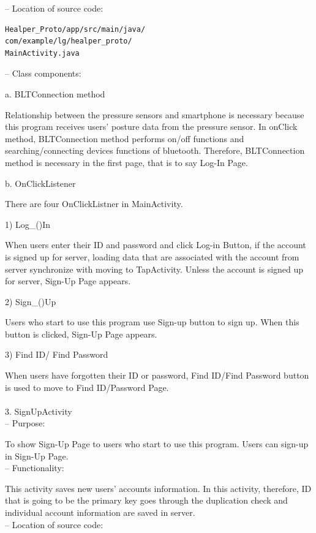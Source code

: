 \documentclass[conference]{IEEEtran}
\begin{document}
 -- Location of source code:
 
\begin{verbatim}
Healper_Proto/app/src/main/java/
com/example/lg/healper_proto/
MainActivity.java
\end{verbatim}

 -- Class components:

a. BLTConnection method

Relationship between the pressure sensors and smartphone is necessary because this program receives users’ posture data from the pressure sensor. In onClick method, BLTConnection method performs on/off functions and searching/connecting devices functions of bluetooth. Therefore, BLTConnection method is necessary in the first page, that is to say Log-In Page. 

b. OnClickListener

There are four OnClickListner in MainActivity.

  1) Log\_()In
  
When users enter their ID and password and click Log-in Button, if the account is signed up for server, loading data that are associated with the account from server synchronize with moving to TapActivity. Unless the account is signed up for server, Sign-Up Page appears.

  2) Sign\_()Up
  
Users who start to use this program use Sign-up button to sign up. When this button is clicked, Sign-Up Page appears.

  3) Find ID/ Find Password
  
When users have forgotten their ID or password, Find ID/Find Password button is used to move to Find ID/Password Page.\\\\

3.	SignUpActivity\\

 --	Purpose:

To show Sign-Up Page to users who start to use this program. Users can sign-up in Sign-Up Page. \\

 --	Functionality:

This activity saves new users' accounts information. In this activity, therefore, ID that is going to be the primary key goes through the duplication check and individual account information are saved in server.\\
 
 --	Location of source code:
\end{document}
